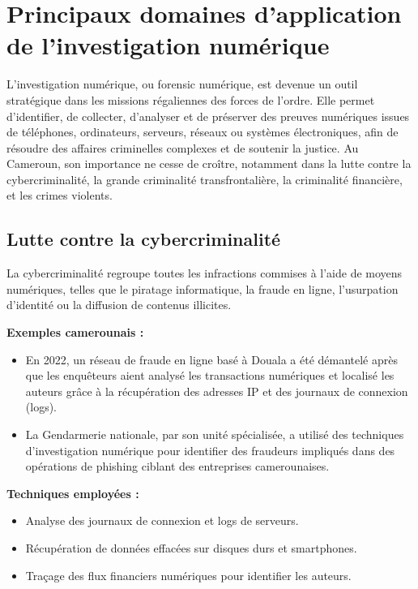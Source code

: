 \documentclass[12pt,a4paper]{article}
\begin{document}
\section{Principaux domaines d'application de l'investigation numérique}

L'investigation numérique, ou forensic numérique, est devenue un outil stratégique dans les missions régaliennes des forces de l'ordre. Elle permet d'identifier, de collecter, d'analyser et de préserver des preuves numériques issues de téléphones, ordinateurs, serveurs, réseaux ou systèmes électroniques, afin de résoudre des affaires criminelles complexes et de soutenir la justice. Au Cameroun, son importance ne cesse de croître, notamment dans la lutte contre la cybercriminalité, la grande criminalité transfrontalière, la criminalité financière, et les crimes violents.

\subsection{Lutte contre la cybercriminalité}

La cybercriminalité regroupe toutes les infractions commises à l'aide de moyens numériques, telles que le piratage informatique, la fraude en ligne, l'usurpation d'identité ou la diffusion de contenus illicites.

\textbf{Exemples camerounais :}
\begin{itemize}[leftmargin=*]
    \item En 2022, un réseau de fraude en ligne basé à Douala a été démantelé après que les enquêteurs aient analysé les transactions numériques et localisé les auteurs grâce à la récupération des adresses IP et des journaux de connexion (logs).
    \item La Gendarmerie nationale, par son unité spécialisée, a utilisé des techniques d'investigation numérique pour identifier des fraudeurs impliqués dans des opérations de phishing ciblant des entreprises camerounaises.
\end{itemize}

\textbf{Techniques employées :}
\begin{itemize}[leftmargin=*]
    \item Analyse des journaux de connexion et logs de serveurs.
    \item Récupération de données effacées sur disques durs et smartphones.
    \item Traçage des flux financiers numériques pour identifier les auteurs.
\end{itemize}
\end{document}
